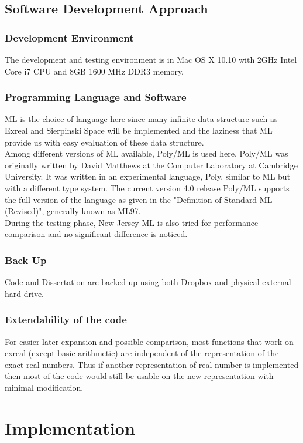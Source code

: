 \documentclass[12pt,twoside,notitlepage]{report}
\begin{document}
\section {Software Development Approach}
\subsection {Development Environment}
The development and testing environment is in Mac OS X 10.10 with 2GHz Intel Core i7 CPU and 8GB 1600 MHz DDR3 memory. 
\subsection {Programming Language and Software}
ML is the choice of language here since many infinite data structure such as Exreal and Sierpinski Space will be implemented and the laziness that ML provide us with easy evaluation of these data structure.\\
Among different versions of ML available, Poly/ML is used here. Poly/ML was originally written by David Matthews at the Computer Laboratory at Cambridge University.  It was written in an experimental language, Poly, similar to ML but with a different type system. The current version 4.0 release Poly/ML supports the full version of the language as given in the "Definition of Standard ML (Revised)", generally known as ML97. \cite{poly} \\
During the testing phase, New Jersey ML \cite{njml} is also tried for performance comparison and no significant difference is noticed.

\subsection {Back Up}
Code and Dissertation are backed up using both Dropbox and physical external hard drive.
\subsection {Extendability of the code}
For easier later expansion and possible comparison, most functions that work on exreal (except basic arithmetic) are independent of the representation of the exact real numbers. Thus if another representation of real number is implemented then most of the code would still be usable on the new representation with minimal modification.



\cleardoublepage
\chapter{Implementation}
\end{document}
